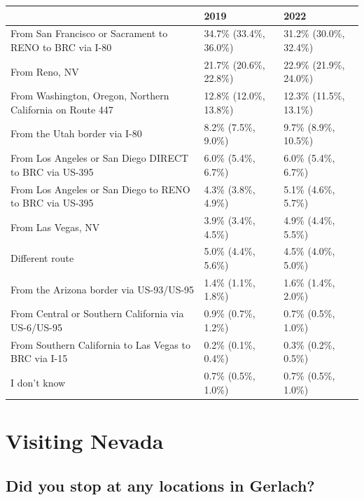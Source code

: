 \documentclass[
]{book}
\begin{document}
\begin{table}
\centering
\begin{tabular}[t]{>{}l|>{}l|>{}l}
\hline
  & 2019 & 2022\\
\hline
From San Francisco or 
 Sacrament to RENO 
 to BRC via I-80 & 34.7\% (33.4\%, 36.0\%) & 31.2\% (30.0\%, 32.4\%)\\
\hline
From Reno, NV & 21.7\% (20.6\%, 22.8\%) & 22.9\% (21.9\%, 24.0\%)\\
\hline
From Washington, Oregon, 
 Northern California 
 on Route 447 & 12.8\% (12.0\%, 13.8\%) & 12.3\% (11.5\%, 13.1\%)\\
\hline
From the Utah border 
 via I-80 & 8.2\% (7.5\%, 9.0\%) & 9.7\% (8.9\%, 10.5\%)\\
\hline
From Los Angeles 
 or San Diego DIRECT 
 to BRC via US-395 & 6.0\% (5.4\%, 6.7\%) & 6.0\% (5.4\%, 6.7\%)\\
\hline
From Los Angeles or 
 San Diego to RENO 
 to BRC via US-395 & 4.3\% (3.8\%, 4.9\%) & 5.1\% (4.6\%, 5.7\%)\\
\hline
From Las Vegas, NV & 3.9\% (3.4\%, 4.5\%) & 4.9\% (4.4\%, 5.5\%)\\
\hline
Different route & 5.0\% (4.4\%, 5.6\%) & 4.5\% (4.0\%, 5.0\%)\\
\hline
From the Arizona border 
 via US-93/US-95 & 1.4\% (1.1\%, 1.8\%) & 1.6\% (1.4\%, 2.0\%)\\
\hline
From Central or 
 Southern California 
 via US-6/US-95 & 0.9\% (0.7\%, 1.2\%) & 0.7\% (0.5\%, 1.0\%)\\
\hline
From Southern California 
 to Las Vegas 
 to BRC via I-15 & 0.2\% (0.1\%, 0.4\%) & 0.3\% (0.2\%, 0.5\%)\\
\hline
I don't know & 0.7\% (0.5\%, 1.0\%) & 0.7\% (0.5\%, 1.0\%)\\
\hline
\end{tabular}
\end{table}

\hypertarget{visiting-nevada}{%
\section{Visiting Nevada}\label{visiting-nevada}}

\hypertarget{did-you-stop-at-any-locations-in-gerlach}{%
\subsection{Did you stop at any locations in Gerlach?}\label{did-you-stop-at-any-locations-in-gerlach}}
\end{document}
